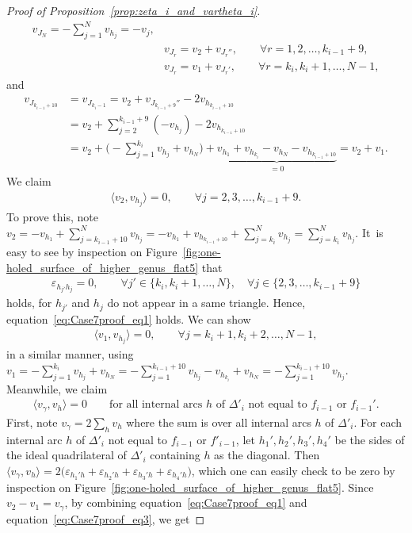 \documentclass[10pt,a4paper]{amsart}
\numberwithin{equation}{section}
\theoremstyle{definition}
\begin{document}
\begin{proof}[Proof of Proposition~\ref{prop:zeta_i_and_vartheta_i}]
\begin{align*}
 v_{J_N} = -\sum_{j=1}^{N} v_{h_j} = -v_j, \\
&v_{J_r} = v_2 + v_{J_r''}, \qquad \forall r=1,2,\dots,k_{i-1}+9, \\
&v_{J_r} = v_1 + v_{J_r'}, \qquad \forall r = k_i,k_i+1,\dots,N-1,
\end{align*}
and
\begin{align*}
v_{J_{k_{i-1}+10}} & = v_{J_{k_i-1}} = v_2 + v_{J_{k_{i-1}+9}''} - 2 v_{h_{k_{i-1}+10}} \\
& = v_2 + \sum_{j=2}^{k_{i-1}+9} (-v_{h_j}) - 2 v_{h_{k_{i-1}+10}} \\
& = v_2 + \biggl( - \sum_{j=1}^{k_i} v_{h_j} + v_{h_N} \biggr) + \underbrace{ v_{h_1} + v_{h_{k_i}} - v_{h_N} - v_{h_{k_{i-1}+10}} }_{=0} = v_2 + v_1.
\end{align*}
We claim
\begin{align}
\label{eq:Case7proof_eq1}
\langle v_2, v_{h_j} \rangle=0, \qquad \forall j=2,3,\dots,k_{i-1}+9.
\end{align}
To prove this, note $v_2 = -v_{h_1} + \sum_{j=k_{i-1}+10}^N v_{h_j} = -v_{h_1} + v_{h_{k_{i-1}+10}} + \sum_{j=k_i}^N v_{h_j} = \sum_{j=k_i}^N v_{h_j}$. It~is easy to see by inspection on Figure~\ref{fig:one-holed_surface_of_higher_genus_flat5} that
\begin{align*}
\varepsilon_{h_{j'} h_j} = 0, \qquad \forall j' \in \{k_i,k_i+1,\dots,N\}, \quad \forall j \in \{2,3,\dots,k_{i-1}+9\}
\end{align*}
holds, for $h_{j'}$ and $h_j$ do not appear in a same triangle. Hence, equation~\eqref{eq:Case7proof_eq1} holds. We can show
\begin{align}
\label{eq:Case7proof_eq2}
\langle v_1, v_{h_j} \rangle=0, \qquad \forall j=k_i+1,k_i+2,\dots,N-1,
\end{align}
in a similar manner, using $v_1 = - \sum_{j=1}^{k_i} v_{h_j} + v_{h_N} = - \sum_{j=1}^{k_{i-1}+10} v_{h_j} - v_{h_{k_i}} + v_{h_N} = - \sum_{j=1}^{k_{i-1}+10} v_{h_j}$. Meanwhile, we claim
\begin{align}
\label{eq:Case7proof_eq3}
\langle v_\gamma, v_h \rangle=0 \qquad \mbox{for all internal arcs $h$ of $\Delta'_i$ not equal to $f_{i-1}$ or $f_{i-1}'$}.
\end{align}
First, note $v_\gamma = 2 \sum_h v_h$ where the sum is over all internal arcs $h$ of $\Delta'_i$. For each internal arc $h$ of $\Delta'_i$ not equal to $f_{i-1}$ or $f'_{i-1}$, let $h_1',h_2',h_3',h_4'$ be the sides of the ideal quadrilateral of $\Delta'_i$ containing $h$ as the diagonal. Then $\langle v_\gamma, v_h\rangle = 2\bigl(\varepsilon_{h_1' h} +\varepsilon_{h_2' h} +\varepsilon_{h_3' h} +\varepsilon_{h_4' h} \bigr)$, which one can easily check to be zero by inspection on Figure~\ref{fig:one-holed_surface_of_higher_genus_flat5}. Since $v_2 - v_1 = v_\gamma$, by combining equation~\eqref{eq:Case7proof_eq1} and equation~\eqref{eq:Case7proof_eq3}, we get

\end{proof}
\end{document}
